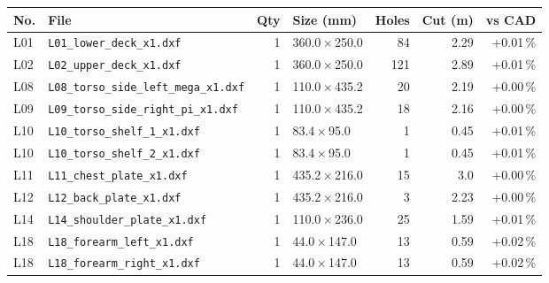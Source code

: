 \begin{table}[H]\small
\begin{tabularx}{\linewidth}{@{}lLrlrrr@{}}
\toprule
\textbf{No.} & \textbf{File} & \textbf{Qty} & \textbf{Size (mm)} & \textbf{Holes} & \textbf{Cut (m)} & \textbf{vs CAD}\\
\midrule
L01 & {\scriptsize\nolinkurl{L01_lower_deck_x1.dxf}} & 1 & 360.0\,$\times$\,250.0 & 84 & 2.29 & +0.01\,\%\\
L02 & {\scriptsize\nolinkurl{L02_upper_deck_x1.dxf}} & 1 & 360.0\,$\times$\,250.0 & 121 & 2.89 & +0.01\,\%\\
L08 & {\scriptsize\nolinkurl{L08_torso_side_left_mega_x1.dxf}} & 1 & 110.0\,$\times$\,435.2 & 20 & 2.19 & +0.00\,\%\\
L09 & {\scriptsize\nolinkurl{L09_torso_side_right_pi_x1.dxf}} & 1 & 110.0\,$\times$\,435.2 & 18 & 2.16 & +0.00\,\%\\
L10 & {\scriptsize\nolinkurl{L10_torso_shelf_1_x1.dxf}} & 1 & 83.4\,$\times$\,95.0 & 1 & 0.45 & +0.01\,\%\\
L10 & {\scriptsize\nolinkurl{L10_torso_shelf_2_x1.dxf}} & 1 & 83.4\,$\times$\,95.0 & 1 & 0.45 & +0.01\,\%\\
L11 & {\scriptsize\nolinkurl{L11_chest_plate_x1.dxf}} & 1 & 435.2\,$\times$\,216.0 & 15 & 3.0 & +0.00\,\%\\
L12 & {\scriptsize\nolinkurl{L12_back_plate_x1.dxf}} & 1 & 435.2\,$\times$\,216.0 & 3 & 2.23 & +0.00\,\%\\
L14 & {\scriptsize\nolinkurl{L14_shoulder_plate_x1.dxf}} & 1 & 110.0\,$\times$\,236.0 & 25 & 1.59 & +0.01\,\%\\
L18 & {\scriptsize\nolinkurl{L18_forearm_left_x1.dxf}} & 1 & 44.0\,$\times$\,147.0 & 13 & 0.59 & +0.02\,\%\\
L18 & {\scriptsize\nolinkurl{L18_forearm_right_x1.dxf}} & 1 & 44.0\,$\times$\,147.0 & 13 & 0.59 & +0.02\,\%\\
\bottomrule
\end{tabularx}
\end{table}
